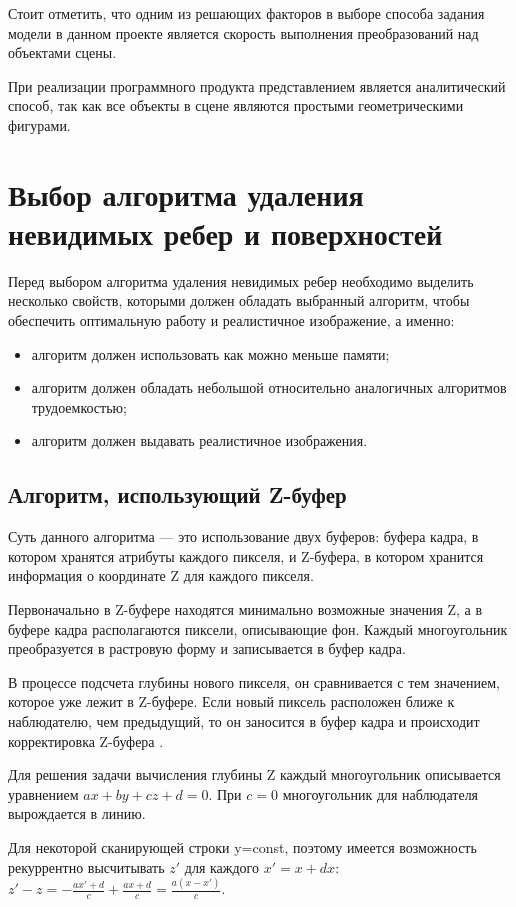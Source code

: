 Стоит отметить, что одним из решающих факторов в выборе способа задания модели в данном проекте является скорость выполнения преобразований над объектами сцены.

При реализации программного продукта представлением является аналитический способ, так как все объекты в сцене являются простыми геометрическими фигурами.

\section{Выбор алгоритма удаления невидимых ребер и поверхностей}

Перед выбором алгоритма удаления невидимых ребер необходимо выделить несколько свойств, которыми должен обладать выбранный алгоритм, чтобы обеспечить оптимальную работу и реалистичное изображение, а именно:

\begin{itemize}
	\item	алгоритм должен использовать как можно меньше памяти;
	\item	алгоритм должен обладать небольшой относительно аналогичных алгоритмов трудоемкостью;
	\item	алгоритм должен выдавать реалистичное изображения.
\end{itemize}


\subsection{Алгоритм, использующий Z-буфер}
Суть данного алгоритма --- это использование двух буферов: буфера кадра, в котором хранятся атрибуты каждого пикселя, и Z-буфера, в котором хранится информация о координате Z для каждого пикселя.

Первоначально в Z-буфере находятся минимально возможные значения Z, а в буфере кадра располагаются пиксели, описывающие фон. Каждый многоугольник преобразуется в растровую форму и записывается в буфер кадра.

В процессе подсчета глубины нового пикселя, он сравнивается с тем значением, которое уже лежит в Z-буфере. Если новый пиксель расположен ближе к наблюдателю, чем предыдущий, то он заносится в буфер кадра и происходит корректировка Z-буфера \cite{zbufer}.

Для решения задачи вычисления глубины Z каждый многоугольник описывается уравнением $ax+by+cz+d=0$. При $c=0$ многоугольник для наблюдателя вырождается в линию. 

Для некоторой сканирующей строки y=const, поэтому имеется возможность рекуррентно высчитывать $z'$ для каждого $x'=x+dx$: $z' - z = - \frac{ax' + d}{c} + \frac{ax + d}{c} = \frac{a(x - x')}{c}$.

